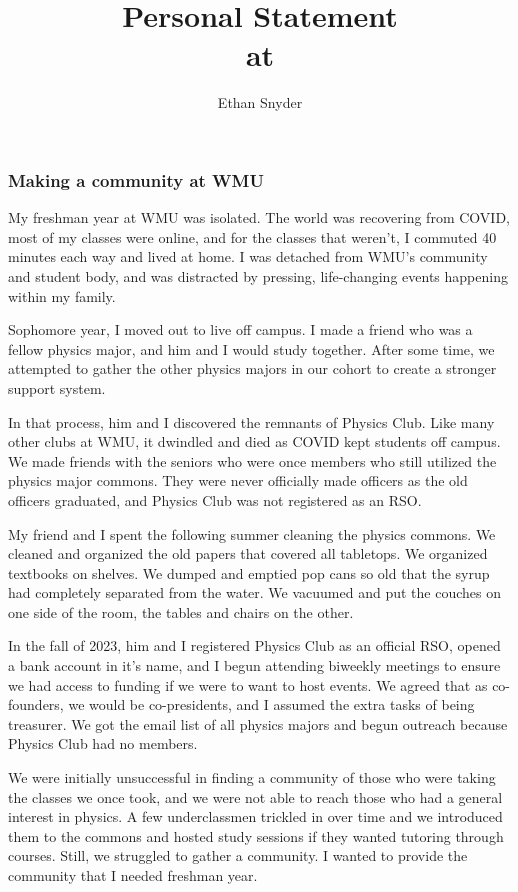 \documentclass[11pt]{article}
\title{Personal Statement\\
	\large \dept{} at \school{}}
\author{Ethan Snyder}
\date{}
\begin{document}
\maketitle
\subsubsection*{Making a community at WMU}
My freshman year at WMU was isolated. The world was recovering from COVID, most of my classes were online, and for the classes that weren't, I commuted 40 minutes each way and lived at home. I was detached from WMU's community and student body, and was distracted by pressing, life-changing events happening within my family.

Sophomore year, I moved out to live off campus. I made a friend who was a fellow physics major, and him and I would study together. After some time, we attempted to gather the other physics majors in our cohort to create a stronger support system.

In that process, him and I discovered the remnants of Physics Club. Like many other clubs at WMU, it dwindled and died as COVID kept students off campus. We made friends with the seniors who were once members who still utilized the physics major commons. They were never officially made officers as the old officers graduated, and Physics Club was not registered as an RSO.

My friend and I spent the following summer cleaning the physics commons. We cleaned and organized the old papers that covered all tabletops. We organized textbooks on shelves. We dumped and emptied pop cans so old that the syrup had completely separated from the water. We vacuumed and put the couches on one side of the room, the tables and chairs on the other.

In the fall of 2023, him and I registered Physics Club as an official RSO, opened a bank account in it's name, and I begun attending biweekly meetings to ensure we had access to funding if we were to want to host events. We agreed that as co-founders, we would be co-presidents, and I assumed the extra tasks of being treasurer. We got the email list of all physics majors and begun outreach because Physics Club had no members.

We were initially unsuccessful in finding a community of those who were taking the classes we once took, and we were not able to reach those who had a general interest in physics. A few underclassmen trickled in over time and we introduced them to the commons and hosted study sessions if they wanted tutoring through courses. Still, we struggled to gather a community. I wanted to provide the community that I needed freshman year.
\end{document}
